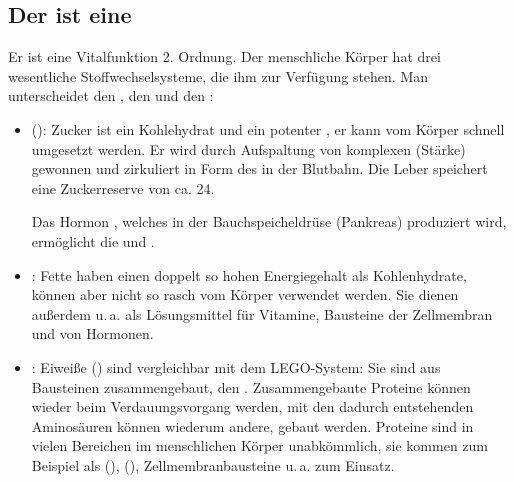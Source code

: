 \subsection{Der  ist eine }
\label{topic:stoffwechsel}
\label{topic:vitalfunktion-stoffwechsel}




\TextSlide{\TxBeschreibung}
{%
Er ist eine Vitalfunktion 2. Ordnung.
Der menschliche Körper hat drei wesentliche
Stoffwechselsysteme, die ihm zur Verfügung stehen. Man
unterscheidet den ,
den  und den :
\begin{itemize}
  \item {} (): 
  Zucker ist ein 
  Kohlehydrat 
  und ein potenter , 
  er kann vom Körper schnell umgesetzt werden. 
  Er wird durch
  Aufspaltung von komplexen  (Stärke)
  gewonnen und zirkuliert in Form des  in der
  Blutbahn. 
  Die Leber speichert eine Zuckerreserve von ca.
  24\Hour*.
  
  Das Hormon \label{topic:insulin}, welches in der
  Bauchspeicheldrüse (Pankreas) produziert wird,  ermöglicht
  die  und .
  \item {}: Fette haben einen doppelt so
  hohen Energiegehalt als Kohlenhydrate, können aber nicht so
  rasch vom Körper verwendet werden. Sie dienen außerdem
  u.\,a. als Lösungsmittel für Vitamine, Bausteine der
  Zellmembran und von Hormonen. 
  \item {}: Eiweiße ()
  sind vergleichbar mit dem LEGO{\texttrademark}-System: Sie
  sind aus Bausteinen zusammengebaut, den .
  Zusammengebaute Proteine können wieder beim
  Verdauungsvorgang  werden, mit den
  dadurch entstehenden Aminosäuren können wiederum andere,
   gebaut werden. Proteine sind in vielen
  Bereichen im menschlichen Körper unabkömmlich, sie kommen
  zum Beispiel als 
  (), 
  (), Zellmembranbausteine
  u.\,a. zum Einsatz.
\end{itemize}


}
